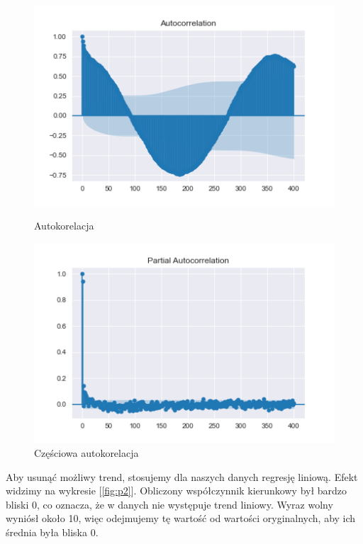 \documentclass{article}
\theoremstyle{break}
\begin{document}
	\begin{figure}[H]
		\begin{center}
			\begin{minipage}{0.49\linewidth}
				\centering
				\includegraphics[scale=0.49]{acf1.png}
				\caption{Autokorelacja}
				\label{fig:acf1}
			\end{minipage}
			\begin{minipage}{0.49\linewidth}
				\centering
				\includegraphics[scale=0.49]{pacf1.png}
				\caption{Częściowa autokorelacja}
				\label{fig:pacf1}
			\end{minipage}
		\end{center}
	\end{figure}
	
	Aby usunąć możliwy trend, stosujemy dla naszych danych regresję liniową. Efekt widzimy na wykresie [\ref*{fig:p2}]. Obliczony współczynnik kierunkowy był bardzo bliski 0, co oznacza, że w danych nie występuje trend liniowy. Wyraz wolny wyniósł około 10, więc odejmujemy tę wartość od wartości oryginalnych, aby ich średnia była bliska 0.
	
\end{document}
